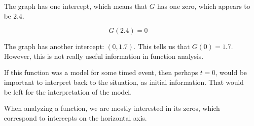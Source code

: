 \documentclass{ximera}
\begin{document}
The graph has one intercept, which means that $G$ has one zero, which appears to be $2.4$. 

\[  G(2.4) = 0  \]




The graph has another intercept: $(0, 1.7)$. This tells us that $G(0)=1.7$.  However, this is not really useful information in function analysis. 


If this function was a model for some timed event, then perhaps $t = 0$, would be important to interpret back to the situation, as initial information.  That would be left for the interpretation of the model. 


When analyzing a function, we are mostly interested in its zeros, which correspond to intercepts on the horizontal axis.
\end{document}

